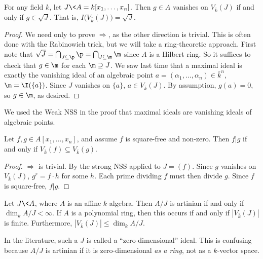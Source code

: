  \begin{theorem}
   For any field $k$, let $J\< A=k[x_1,\dots, x_n]$. Then $g\in A$ vanishes on $V_{\bar
   k}(J)$ if and only if $g\in \sqrt J$. That is, $I\bigl(V_{\bar k}(J)\bigr)=\sqrt J$.
 \end{theorem}
 \begin{proof}
   We need only to prove $\Rightarrow$, as the other direction is trivial. This is often
   done with the Rabinowich trick, but we will take a ring-theoretic approach. First note
   that $\sqrt J = \bigcap_{J\subseteq \p} \p =\bigcap_{J\subseteq \m}\m$ since $A$ is a
   Hilbert ring. So it suffices to check that $g\in \m$ for each $\m\supseteq J$. We saw
   last time that a maximal ideal is exactly the vanishing ideal of an algebraic
   point $a=(\alpha_1,\dots, \alpha_n)\in \bar k^n$, $\m=\I(\{a\})$. Since $J$ vanishes on
   $\{a\}$, $a\in V_{\bar k}(J)$. By assumption, $g(a)=0$, so $g\in \m$, as desired.
 \end{proof}
 \begin{remark}
   We used the Weak NSS in the proof that maximal ideals are vanishing ideals of
   algebraic points.
 \end{remark}
 \begin{corollary}
   Let $f,g\in A[x_1,\dots, x_n]$, and assume $f$ is square-free and non-zero. Then $f|g$
   if and only if $V_{\bar k}(f)\subseteq V_{\bar k}(g)$.
 \end{corollary}
 \begin{proof}
   $\Rightarrow$ is trivial. By the strong NSS applied to $J=(f)$. Since $g$ vanishes on
   $V_{\bar k}(J)$, $g^r=f\cdot h$ for some $h$. Each prime dividing $f$ must then divide
   $g$. Since $f$ is square-free, $f|g$.
 \end{proof}
 \begin{theorem}
   Let $J\< A$, where $A$ is an affine $k$-algebra. Then $A/J$ is artinian if and only if
   $\dim_k A/J< \infty$. If $A$ is a polynomial ring, then this occurs if and only if
   $|V_{\bar k}(J)|$ is finite. Furthermore, $|V_{\bar k}(J)|\le \dim_k A/J$.
 \end{theorem}
 \begin{warning}
   In the literature, such a $J$ is called a ``zero-dimensional'' ideal. This is confusing
   because $A/J$ is artinian if it is zero-dimensional \emph{as a ring}, not as a
   $k$-vector space.
 \end{warning}
